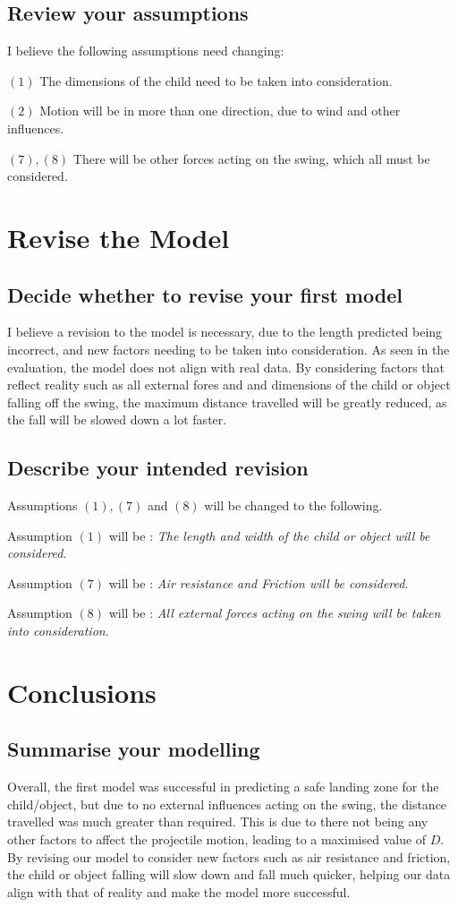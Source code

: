 \documentclass{article}
\begin{document}
\subsection*{Review your assumptions}
I believe the following assumptions need changing:
\par
\noindent $(1)$ The dimensions of the child need to be taken into consideration.
\par
\noindent $(2)$ Motion will be in more than one direction, due to wind and other influences.
\par
\noindent $(7), (8)$ There will be other forces acting on the swing, which all must be considered.

\section*{Revise the Model}

\subsection*{Decide whether to revise your first model}
I believe a revision to the model is necessary, due to the length predicted being incorrect, and new factors needing to be taken into consideration. As seen in the evaluation, the model does not align with real data. By considering factors that reflect reality such as all external fores and and dimensions of the child or object falling off the swing, the maximum distance travelled will be greatly reduced, as the fall will be slowed down a lot faster.

\subsection*{Describe your intended revision}
Assumptions $(1), (7)$ and $(8)$ will be changed to the following.
\par
Assumption $(1)$ will be : \textit{The length and width of the child or object will be considered}.
\par
Assumption $(7)$ will be : \textit{Air resistance and Friction will be considered}.
\par
Assumption $(8)$ will be : \textit{All external forces acting on the swing will be taken into consideration}.

\section*{Conclusions}

\subsection*{Summarise your modelling}
Overall, the first model was successful in predicting a safe landing zone for the child/object, but due to no external influences acting on the swing, the distance travelled was much greater than required. This is due to there not being any other factors to affect the projectile motion, leading to a maximised value of $D$. By revising our model to consider new factors such as air resistance and friction, the child or object falling will slow down and fall much quicker, helping our data align with that of reality and make the model more successful.
\end{document}
